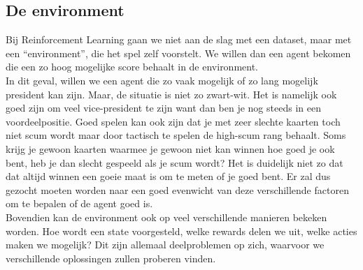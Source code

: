 \documentclass[11pt]{article}
\begin{document}
\subsection{De environment}
Bij Reinforcement Learning gaan we niet aan de slag met een dataset, maar met een “environment”, die het spel zelf voorstelt. We willen dan een agent bekomen die een zo hoog mogelijke score behaalt in de environment. \\
In dit geval, willen we een agent die zo vaak mogelijk of zo lang mogelijk president kan zijn. Maar, de situatie is niet zo zwart-wit. Het is namelijk ook goed zijn om veel vice-president te zijn want dan ben je nog steeds in een voordeelpositie. Goed spelen kan ook zijn dat je met zeer slechte kaarten toch niet scum wordt maar door tactisch te spelen de high-scum rang behaalt. Soms krijg je gewoon kaarten waarmee je gewoon niet kan winnen hoe goed je ook bent, heb je dan slecht gespeeld als je scum wordt? Het is duidelijk niet zo dat dat altijd winnen een goeie maat is om te meten of je goed bent. Er zal dus gezocht moeten worden naar een goed evenwicht van deze verschillende factoren om te bepalen of de agent goed is. \\
Bovendien kan de environment ook op veel verschillende manieren bekeken worden. Hoe wordt een state voorgesteld, welke rewards delen we uit, welke acties maken we mogelijk? Dit zijn allemaal deelproblemen op zich, waarvoor we verschillende oplossingen zullen proberen vinden.\\
\end{document}
